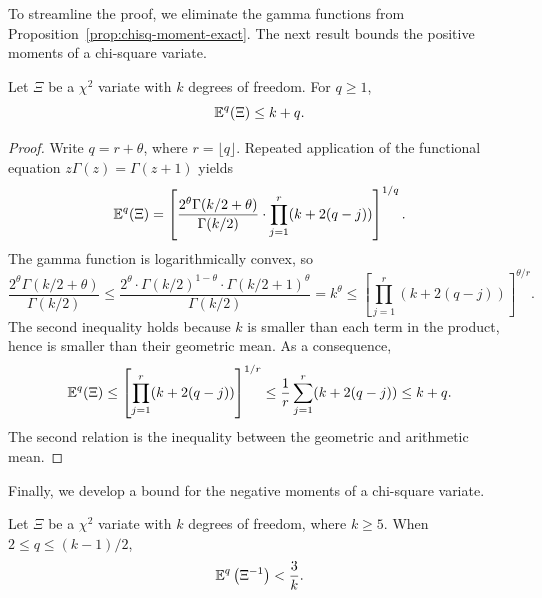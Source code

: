 \documentclass[final]{siamltex}
\begin{document}
\begin{appendix}
\lsp

To streamline the proof, we eliminate the gamma functions from Proposition~\ref{prop:chisq-moment-exact}.
The next result bounds the positive moments of a chi-square variate.

\lsp

\begin{lemma} \label{lem:chisq-moment}
Let $\Xi$ be a $\chi^2$ variate with $k$ degrees of freedom.  For $q \geq 1$,
$$
\operatorname{\mathbb{E}}^q (\Xi) \leq k+q.
$$
\end{lemma}

\begin{proof}
Write $q = r + \theta$, where $r = \lfloor q \rfloor$.  Repeated application of the
functional equation $z\Gamma(z) = \Gamma(z+1)$ yields
$$
\operatorname{\mathbb{E}}^q (\Xi)
    = \left[ \frac{2^\theta \Gamma(k/2 + \theta)}{\Gamma(k/2)}
        \cdot \prod_{j=1}^{r} (k + 2(q-j)) \right]^{1/q}.
$$
The gamma function is logarithmically convex, so
$$
\frac{2^\theta \Gamma(k/2 + \theta)}{\Gamma(k/2)}
    \leq \frac{2^\theta \cdot \Gamma(k/2)^{1-\theta} \cdot \Gamma(k/2 + 1)^\theta}{\Gamma(k/2)}
    = k^\theta
    \leq \left[ \prod_{j=1}^r (k + 2(q-j)) \right]^{\theta/r}.
$$
The second inequality holds because $k$ is smaller than each term in
the product, hence is smaller than their geometric mean.  As a
consequence,
$$
\operatorname{\mathbb{E}}^q(\Xi)
    \leq \left[\prod_{j=1}^r (k + 2(q-j)) \right]^{1/r}
    \leq \frac{1}{r} \sum_{j=1}^r (k + 2(q-j))
    \leq k + q.
$$
The second relation is the inequality between the geometric and arithmetic mean.
\end{proof}

\lsp

Finally, we develop a bound for the negative moments of a chi-square variate.

\lsp

\begin{lemma} \label{lem:inv-chisq-moment}
Let $\Xi$ be a $\chi^2$ variate with $k$ degrees of freedom, where $k \geq 5$.
When $2 \leq q \leq (k-1)/2$,
$$
\operatorname{\mathbb{E}}^q \left( \Xi^{-1} \right)
    < \frac{3}{k}.
$$
\end{lemma}


\end{appendix}
\end{document}
